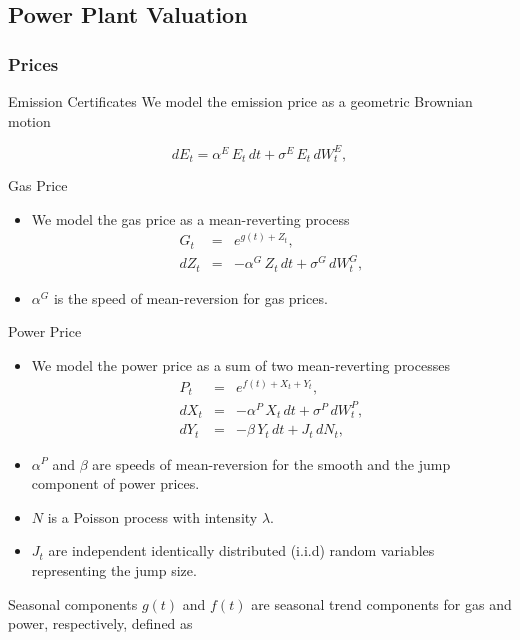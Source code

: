 \subsection{Power Plant Valuation}
\subsubsection{Prices}

{ Emission Certificates}
We model the emission price as a geometric Brownian motion

\begin{equation}
d{E}_t = \alpha^E\,E_t\,d{t} + \sigma^E\,E_t\,d{W}^E_t,
\label{co2}
\end{equation}

{Gas Price}
\begin{itemize}
\item We model the gas price as a mean-reverting process
\begin{eqnarray}
G_t & = & e^{g(t) + Z_t},  \nonumber \\
d{Z}_t & = & -\alpha^G\,Z_t\,d{t} + \sigma^G\,d{W}^G_t,
\label{gas}
\end{eqnarray}
\item $\alpha^G$ is the speed of mean-reversion for gas prices.
\end{itemize}

{Power Price}
\begin{itemize}
\item We model the power price as a sum of two mean-reverting processes
\begin{eqnarray}
P_t & = & e^{f(t) + X_t + Y_t},  \nonumber \\
d{X}_t & = & -\alpha^P\,X_t\,d{t} + \sigma^P\,d{W}^P_t, \nonumber \\
d{Y}_t & = & -\beta\,Y_t\,d{t} + J_t\,d{N}_t,
\label{power}
\end{eqnarray}
\item $\alpha^P$ and $\beta$ are speeds of mean-reversion for the smooth and the jump component of power prices.
\item $N$ is a Poisson process with intensity $\lambda$.
\item $J_t$ are independent identically distributed (i.i.d) random variables representing the jump size.
\end{itemize}

{Seasonal components}
$g(t)$ and $f(t)$ are seasonal trend components for gas and power, respectively, defined as

